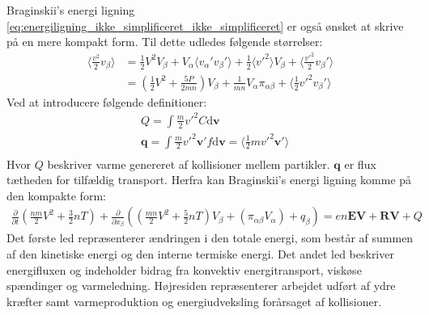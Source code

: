 Braginskii's energi ligning \eqref{eq:energiligning_ikke_simplificeret_ikke_simplificeret} er også 
ønsket at skrive på en mere kompakt form. Til dette udledes følgende størrelser:
\begin{align*}
    \langle \frac{v^2}{2} v_\beta \rangle &= \frac{1}{2} V^2 V_\beta + V_\alpha 
    \langle v_\alpha' v_\beta' \rangle + \frac{1}{2} \langle v'^2 \rangle V_\beta +
    \langle \frac{v'^2}{2} v_\beta' \rangle \\
    &= \left( \frac{1}{2} V^2 + \frac{5P}{2mn} \right) V_\beta + 
    \frac{1}{mn} V_\alpha \pi_{\alpha\beta}  + \langle \frac{1}{2} v'^2 v_\beta' \rangle
\end{align*}
Ved at introducere følgende definitioner:
\begin{align*}
    &Q = \int \frac{m}{2} v'^2 C \mathrm{d}\mathbf{v}\\
    &\mathbf{q} = \int \frac{m}{2} v'^2 \mathbf{v}' f \mathrm{d}\mathbf{v} = \langle \frac{1}{2} m v'^2 \mathbf{v}' \rangle \\
\end{align*}
Hvor $Q$ beskriver varme genereret af kollisioner mellem partikler. $\mathbf{q}$ er flux tætheden for tilfældig transport.
Herfra kan Braginskii's energi ligning komme på den kompakte form:
\begin{align}
    \frac{\partial}{\partial t}\left(\frac{nm}{2}  V^2 + \frac{3}{2} n T\right) +
    \frac{\partial}{\partial x_\beta} \left( \left(\frac{mn}{2}V^2  +\frac{5}{2} nT\right)V_\beta +
    \left(\pi_{\alpha \beta} V_\alpha \right) + q_\beta \right) = en\mathbf{EV} + \mathbf{RV} + Q  \label{eq:Braginskii's energi ligning_}
\end{align}
Det første led repræsenterer ændringen i den totale energi, som består af summen af den kinetiske energi og den interne termiske energi. 
Det andet led beskriver energifluxen og indeholder bidrag fra konvektiv energitransport, viskøse spændinger og varmeledning.
Højresiden repræsenterer arbejdet udført af ydre kræfter samt varmeproduktion og energiudveksling forårsaget af kollisioner.

